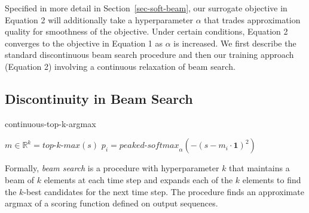\documentclass[letterpaper]{article} \usepackage{aaai18}  \usepackage{times}  \usepackage{helvet}  \usepackage{courier}  \usepackage{url}  \usepackage{graphicx}  \frenchspacing
\begin{document}
Specified in more detail in Section~\ref{sec-soft-beam}, our surrogate objective in Equation 2 will additionally take a hyperparameter $\alpha$ that trades approximation quality for smoothness of the objective. Under certain conditions, Equation 2 converges to the objective in Equation 1 as $\alpha$ is increased. We first describe the standard discontinuous beam search procedure and then our training approach (Equation 2) involving a continuous relaxation of beam search.

\subsection{Discontinuity in Beam Search}
\begin{algorithm*}[t]
\caption{continuous-top-k-argmax}\label{peak}
\begin{algorithmic}[1]
\State $m \in \mathbb{R}^{k} = \textit{top-k-max}(s)$
 
\State $p_{i} = \textit{peaked-softmax}_{\alpha}(-(s - m_i\cdot{\mathbf{1}})^2)$ 
\EndFor
\end{algorithmic}
\end{algorithm*}
Formally, \textit{beam search} is a procedure with hyperparameter $k$ that maintains a beam of $k$ elements at each time step and expands each of the $k$ elements to find the $k$-best candidates for the next time step. The procedure finds an approximate argmax of a scoring function defined on output sequences.
\end{document}
